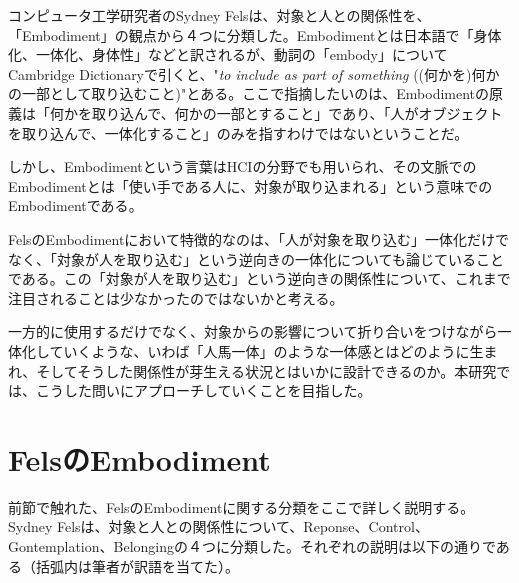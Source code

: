 コンピュータ工学研究者のSydney Felsは、対象と人との関係性を、「Embodiment」の観点から４つに分類した\cite{Fels}。Embodimentとは日本語で「身体化、一体化、身体性」などと訳されるが、動詞の「embody」についてCambridge Dictionaryで引くと、"\textit{to include as part of something} ((何かを)何かの一部として取り込むこと)"とある\cite{embody}。ここで指摘したいのは、Embodimentの原義は「何かを取り込んで、何かの一部とすること」であり、「人がオブジェクトを取り込んで、一体化すること」のみを指すわけではないということだ。

しかし、Embodimentという言葉はHCIの分野でも用いられ、その文脈でのEmbodimentとは「使い手である人に、対象が取り込まれる」という意味でのEmbodimentである\cite{veq}。

FelsのEmbodimentにおいて特徴的なのは、「人が対象を取り込む」一体化だけでなく、「対象が人を取り込む」という逆向きの一体化についても論じていることである。この「対象が人を取り込む」という逆向きの関係性について、これまで注目されることは少なかったのではないかと考える。

一方的に使用するだけでなく、対象からの影響について折り合いをつけながら一体化していくような、いわば「人馬一体」のような一体感とはどのように生まれ、そしてそうした関係性が芽生える状況とはいかに設計できるのか。本研究では、こうした問いにアプローチしていくことを目指した。




\section{FelsのEmbodiment}
前節で触れた、FelsのEmbodimentに関する分類をここで詳しく説明する。
Sydney Felsは、対象と人との関係性について、Reponse、Control、Gontemplation、Belongingの４つに分類した\cite{Fels, Costello2005}。それぞれの説明は以下の通りである（括弧内は筆者が訳語を当てた）。

